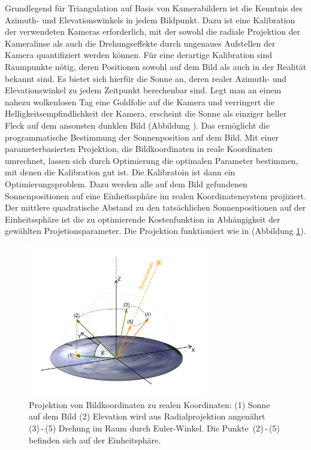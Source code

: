 \documentclass[a4paper,11pt,twoside,german]{article}
\newcommand{\absatz}{\smallbreak} %
\begin{document}
Grundlegend für Triangulation auf Basis von Kamerabildern ist die Kenntnis des
Azimuth- und Elevationswinkels in jedem Bildpunkt. Dazu ist eine Kalibration
der verwendeten Kameras erforderlich, mit der sowohl die radiale Projektion der
Kameralinse als auch die Drehungseffekte durch ungenaues Aufstellen der Kamera
quantifiziert werden können. Für eine derartige Kalibration sind Raumpunkte
nötig, deren Positionen sowohl auf dem Bild als auch in der Realität bekannt
sind. Es bietet sich hierfür die Sonne an, deren realer Azimuth- und
Elevationswinkel zu jedem Zeitpunkt berechenbar sind. Legt man an einem nahezu
wolkenlosen Tag eine Goldfolie auf die Kamera und verringert die
Helligkeitsempfindlichkeit der Kamera, erscheint die Sonne als einziger heller
Fleck auf dem ansonsten dunklen Bild (Abbildung ). Das
ermöglicht die programmatische Bestimmung der Sonnenposition auf dem Bild.
\absatz
Mit einer parameterbasierten Projektion, die Bildkoordinaten in reale
Koordinaten umrechnet, lassen sich durch Optimierung die optimalen Parameter
bestimmen, mit denen die Kalibration gut ist.
Die Kalibratoin ist dann ein Optimierungsproblem.
Dazu werden alle auf dem Bild gefundenen Sonnenpositionen auf eine
Einheitssphäre im realen Koordinatensystem projiziert. Der mittlere
quadratische Abstand zu den tatsächlichen Sonnenpositionen auf der
Einheitssphäre ist die zu optimierende Kostenfunktion in Abhängigkeit der
gewählten Projetionsparameter.
\absatz
Die Projektion funktioniert wie in (Abbildung \ref{FIGProjektion}).

\begin{figure}[!h]
\begin{center}
\includegraphics[width=0.7\textwidth]{media/calibration-chart.png}
\caption{Projektion von Bildkoordinaten zu realen Koordinaten: (1) Sonne auf dem
Bild (2) Elevation wird aus Radialprojektion angenährt (3)\,-\,(5) Drehung im Raum
durch Euler-Winkel. Die Punkte\ (2)\,-\,(5) befinden sich auf der Einheitsphäre.}
\label{FIGProjektion}
\vspace{-0.5cm}
\end{center}
\end{figure}
\end{document}
